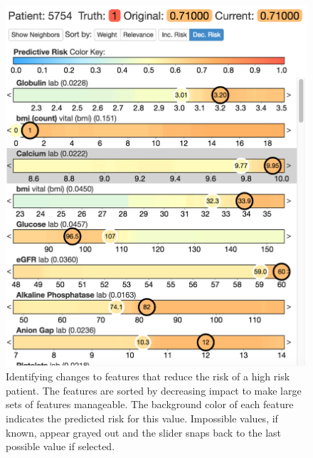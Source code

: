 \begin{figure}
\centering
\begin{minipage}[c]{0.35\textwidth}
\includegraphics[width=\linewidth]{figs/prospector/dec_risk_compact} %
\end{minipage}\hfill
\begin{minipage}[c]{0.6\textwidth}
\caption{
Identifying changes to features that reduce the risk of a high risk patient.
The features are sorted by decreasing impact to make large sets of features manageable.
The background color of each feature indicates the predicted risk for this value.
Impossible values, if known, appear grayed out and the slider snaps back to the last possible value if selected.
}
\label{figs:prospector_risk}
\end{minipage}
\end{figure}